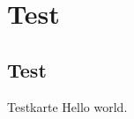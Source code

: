 \documentclass[main.tex]{subfiles}
\begin{document}
\section*{Test}
\subsection*{Test}
\begin{karte}{Testkarte}
    Hello world.
\end{karte}
\end{document}
